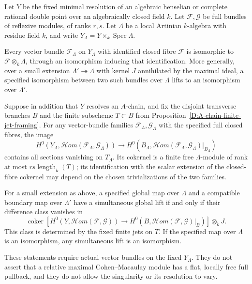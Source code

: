 \begin{proposition}
\label{D:RDP-Artinian-full-bundle-framing}
Let $Y$ be the fixed minimal resolution of an algebraic henselian
or complete rational double point over an algebraically closed field
$k$.  Let $\mathcal F,\mathcal G$ be full bundles of reflexive modules,
of ranks $r,s$.  Let $\Lambda$ be a local Artinian $k$-algebra with
residue field $k$, and write $Y_\Lambda=Y\times_k\operatorname{Spec}\Lambda$.

Every vector bundle $\mathcal F_\Lambda$ on $Y_\Lambda$ with
identified closed fibre $\mathcal F$ is isomorphic to
$\mathcal F\otimes_k\Lambda$, through an isomorphism inducing that
identification.  More generally, over a small extension
$\Lambda'\twoheadrightarrow\Lambda$ with kernel $J$ annihilated
by the maximal ideal, a specified isomorphism between two such
bundles over $\Lambda$ lifts to an isomorphism over $\Lambda'$.

Suppose in addition that $Y$ resolves an $A$-chain, and fix
the disjoint transverse branches $B$ and the finite subscheme
$T\subset B$ from Proposition~\ref{D:A-chain-finite-jet-framing}.
For any vector-bundle families $\mathcal F_\Lambda,\mathcal G_\Lambda$
with the specified full closed fibres, the image
\[
 H^0(Y_\Lambda,\mathcal Hom(\mathcal F_\Lambda,\mathcal G_\Lambda))
 \longrightarrow
 H^0(B_\Lambda,\mathcal Hom(\mathcal F_\Lambda,\mathcal G_\Lambda)|_{B_\Lambda})
                                                        \tag{D.AF.1}
\]
contains all sections vanishing on $T_\Lambda$.
Its cokernel is a finite free $\Lambda$-module of rank at most
$rs\operatorname{length}_k(T)$; its identification with the
scalar extension of the closed-fibre cokernel may depend on
the chosen trivializations of the two families.

For a small extension as above, a specified global map over
$\Lambda$ and a compatible boundary map over $\Lambda'$
have a simultaneous global lift if and only if their difference
class vanishes in
\[
 \operatorname{coker}\!\left[
 H^0(Y,\mathcal Hom(\mathcal F,\mathcal G))
 \to H^0(B,\mathcal Hom(\mathcal F,\mathcal G)|_B)
 \right]\otimes_k J.                                   \tag{D.AF.2}
\]
This class is determined by the fixed finite jets on $T$.
If the specified map over $\Lambda$ is an isomorphism, any
simultaneous lift is an isomorphism.

These statements require actual vector bundles on the fixed
$Y_\Lambda$.  They do not assert that a relative maximal
Cohen--Macaulay module has a flat, locally free full pullback,
and they do not allow the singularity or its resolution to vary.
\end{proposition}
